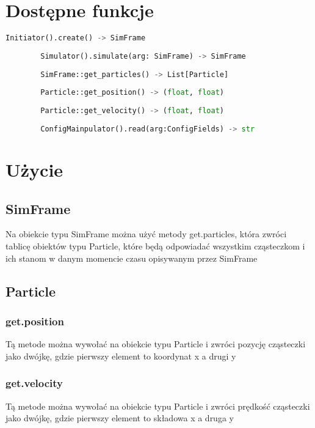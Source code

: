 \documentclass[]{article}
\title{}
\author{}
\begin{document}
\tableofcontents
\pagebreak

\section{Dostępne funkcje}
	\begin{lstlisting}[language=Python, gobble=12]
		Initiator().create() -> SimFrame
			
		Simulator().simulate(arg: SimFrame) -> SimFrame
		
		SimFrame::get_particles() -> List[Particle]
		
		Particle::get_position() -> (float, float)
		
		Particle::get_velocity() -> (float, float)
		
		ConfigMainpulator().read(arg:ConfigFields) -> str
	\end{lstlisting}
\pagebreak

\section{Użycie}

	\subsection{SimFrame}
		Na obiekcie typu SimFrame można użyć metody get.particles, która zwróci tablicę obiektów typu Particle, które będą odpowiadać wszystkim cząsteczkom i ich stanom w danym momencie czasu opisywanym przez SimFrame
		
	\subsection{Particle}
		\subsubsection{get.position}
			Tą metode można wywołać na obiekcie typu Particle i zwróci pozycję cząsteczki jako dwójkę, gdzie pierwszy element to koordynat x a drugi y
		\subsubsection{get.velocity}
			Tą metode można wywołać na obiekcie typu Particle i zwróci prędkość cząsteczki jako dwójkę, gdzie pierwszy element to składowa x a druga y
	
\end{document}
